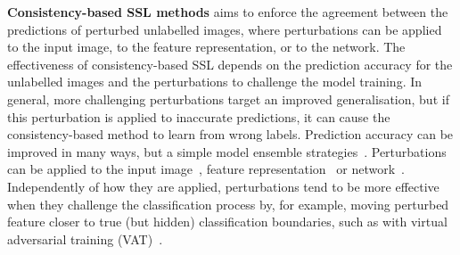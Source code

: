 \documentclass[10pt,twocolumn,letterpaper]{article}
\begin{document}
\noindent \textbf{Consistency-based SSL methods} aims to enforce the agreement between the predictions of perturbed unlabelled images, where perturbations can be applied to the input image, to the feature representation, or to the network. 
The effectiveness of consistency-based SSL depends on the prediction accuracy for the unlabelled images and the perturbations to challenge the model training. 
In general, more challenging perturbations target an improved generalisation, but if this perturbation is applied to inaccurate predictions, it can cause the consistency-based method to learn from wrong labels.  
Prediction accuracy can be improved in many ways, but a simple model ensemble strategies~\cite{laine2016temporal,tarvainen2017mean}.
Perturbations can be applied to the input image~\cite{zou2020pseudoseg}, feature representation~\cite{ouali2020semi} or network~\cite{chen2021semi, ke2020guided}.
Independently of how they are applied, perturbations tend to be more effective when they challenge the classification process by, for example, moving perturbed feature closer to true (but hidden) classification boundaries,
such as with virtual adversarial training (VAT)~\cite{miyato2018virtual}. 
\end{document}
